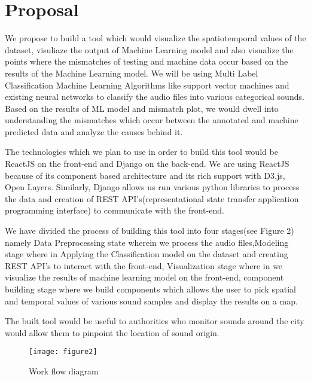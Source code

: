 	\section{Proposal}
    We propose to build a tool which would visualize the spatiotemporal values of the dataset, visuliaze the output of Machine Learning model and also visualize the points where the mismatches of testing and machine data occur based on the results of the Machine Learning model. We will be using Multi Label Classification Machine Learning Algorithms like support vector machines and existing neural networks to classify the audio files into various categorical sounds. Based on the results of ML model and mismatch plot, we would dwell into understanding the mismatches which occur between the annotated and machine predicted data and analyze the causes behind it. 
    
    The technologies which we plan to use in order to build this tool would be ReactJS on the front-end and Django on the back-end. We are using ReactJS because of its component based architecture and its rich support with D3.js, Open Layers. Similarly, Django allows us run various python libraries to process the data and creation of REST API's(representational state transfer application programming interface) to communicate with the front-end. 
   
   	We have divided the process of building this tool into four stages(see Figure 2) namely Data Preprocessing state wherein we process the audio files,Modeling stage where in Applying the Classification model on the dataset and creating REST API's to interact with the front-end, Visualization stage where in we visualize the results of machine learning model on the front-end, component building stage where we build components which allows the user to pick spatial and temporal values of various sound samples and display the results on a map.
   	
    The built tool would be useful to authorities who monitor sounds around the city would allow them to pinpoint the location of sound origin.
	\begin{figure}[h!]
	\texttt{[image: figure2]}
	\caption{ Work flow diagram}
	\end{figure}
	
	
